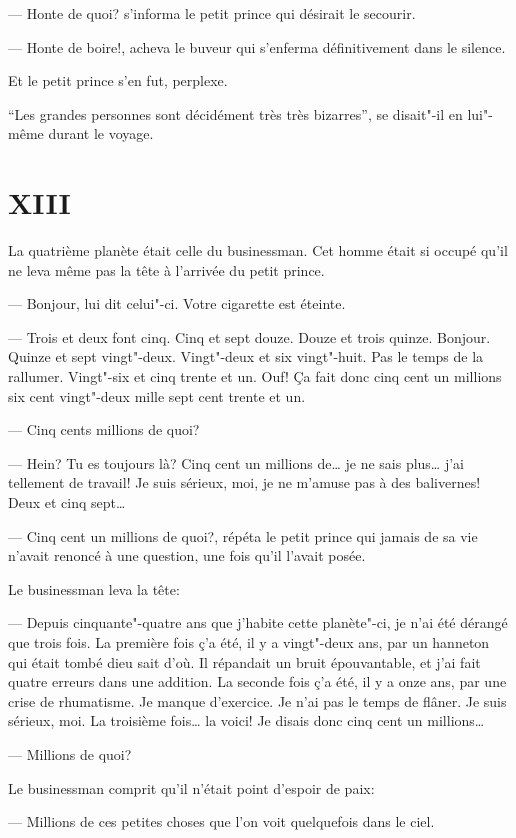 \begin{Parallel}[p]{}{}
{--- Honte de quoi? s'informa le petit prince qui
désirait le secourir.

--- Honte de boire!, acheva le buveur qui s'enferma définitivement dans le silence.

Et le petit prince s'en fut, perplexe.

``Les grandes personnes sont décidément très très
bizarres'', se disait"-il en lui"-même durant le voyage.

\section{XIII}

La quatrième planète était celle du businessman.
Cet homme était si occupé qu'il ne leva même pas la
tête à l'arrivée du petit prince.

--- Bonjour, lui dit celui"-ci. Votre cigarette est
éteinte.

--- Trois et deux font cinq. Cinq et sept douze.
Douze et trois quinze. Bonjour. Quinze et sept vingt"-deux. Vingt"-deux et six vingt"-huit. Pas le temps de la
rallumer. Vingt"-six et cinq trente et un. Ouf! Ça fait
donc cinq cent un millions six cent vingt"-deux mille
sept cent trente et un.

--- Cinq cents millions de quoi?

--- Hein? Tu es toujours là? Cinq cent un millions de\ldots{} je ne sais plus\ldots{} j'ai tellement de travail!
Je suis sérieux, moi, je ne m'amuse pas à des balivernes! Deux et cinq sept\ldots{}

--- Cinq cent un millions de quoi?, répéta le
petit prince qui jamais de sa vie n'avait renoncé à
une question, une fois qu'il l'avait posée.

Le businessman leva la tête:

--- Depuis cinquante"-quatre ans que j'habite cette
planète"-ci, je n'ai été dérangé que trois fois. La première fois ç'a été, il y a vingt"-deux ans, par un hanneton qui était tombé dieu sait d'où. Il répandait un
bruit épouvantable, et j'ai fait quatre erreurs dans
une addition. La seconde fois ç'a été, il y a onze ans,
par une crise de rhumatisme. Je manque d’exercice.
Je n'ai pas le temps de flâner. Je suis sérieux, moi. La
troisième fois\ldots{} la voici! Je disais donc cinq cent un
millions\ldots{}

--- Millions de quoi?

Le businessman comprit qu'il n'était point d'espoir de paix:

--- Millions de ces petites choses que l'on voit quelquefois dans le ciel.

}
\end{Parallel}
